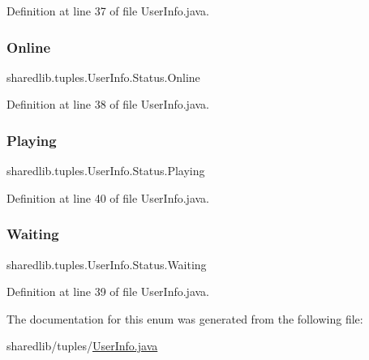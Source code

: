 Definition at line 37 of file User\+Info.\+java.

\hypertarget{enumsharedlib_1_1tuples_1_1_user_info_1_1_status_ac9bc1b0a01d06d34eb9297a72261148c}{}\label{enumsharedlib_1_1tuples_1_1_user_info_1_1_status_ac9bc1b0a01d06d34eb9297a72261148c} 
\subsubsection{\texorpdfstring{Online}{Online}}
{\footnotesize\ttfamily sharedlib.\+tuples.\+User\+Info.\+Status.\+Online}



Definition at line 38 of file User\+Info.\+java.

\hypertarget{enumsharedlib_1_1tuples_1_1_user_info_1_1_status_a084ec6670e26a119c0ac26ea891e7e77}{}\label{enumsharedlib_1_1tuples_1_1_user_info_1_1_status_a084ec6670e26a119c0ac26ea891e7e77} 
\subsubsection{\texorpdfstring{Playing}{Playing}}
{\footnotesize\ttfamily sharedlib.\+tuples.\+User\+Info.\+Status.\+Playing}



Definition at line 40 of file User\+Info.\+java.

\hypertarget{enumsharedlib_1_1tuples_1_1_user_info_1_1_status_a6a945fcd39eedec2f213774c47bbf53b}{}\label{enumsharedlib_1_1tuples_1_1_user_info_1_1_status_a6a945fcd39eedec2f213774c47bbf53b} 
\subsubsection{\texorpdfstring{Waiting}{Waiting}}
{\footnotesize\ttfamily sharedlib.\+tuples.\+User\+Info.\+Status.\+Waiting}



Definition at line 39 of file User\+Info.\+java.



The documentation for this enum was generated from the following file\+:\begin{DoxyCompactItemize}
\item 
sharedlib/tuples/\hyperlink{_user_info_8java}{User\+Info.\+java}\end{DoxyCompactItemize}
